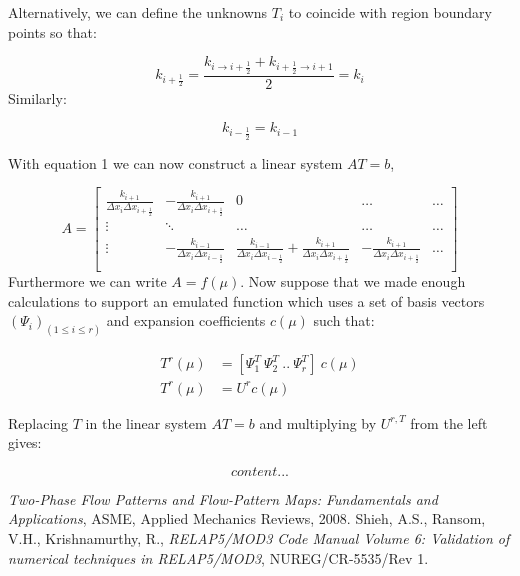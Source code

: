 \documentclass[11pt,letterpaper,titlepage]{article}
\newcommand{\half}{\frac{1}{2}}
\begin{document}
Alternatively, we can define the unknowns $T_i$ to coincide with region boundary points so that:

$$
k_{i+\half} = \frac{k_{i\to i+\half}+k_{i+\half\to i+1}}{2} = k_i
$$
Similarly:

$$
k_{i-\half} = k_{i-1}
$$

\noindent With equation 1 we can now construct a linear system $AT=b$,

\begin{equation*}
A=
\begin{bmatrix}
\frac{k_{i+1}}{\Delta x_i \Delta x_{i+\half}}
&-\frac{k_{i+1}}{\Delta x_i \Delta x_{i+\half}} &0 &\hdots &\hdots\\
\vdots &\ddots &\hdots &\hdots &\hdots\\
\vdots
&-\frac{k_{i-1}}{\Delta x_i \Delta x_{i-\half}} 
&\frac{k_{i-1}}{\Delta x_i \Delta x_{i-\half}} + \frac{k_{i+1}}{\Delta x_i \Delta x_{i+\half}}
&-\frac{k_{i+1}}{\Delta x_i \Delta x_{i+\half}}
&\hdots   \\
\end{bmatrix}
\end{equation*}
\newline
\noindent Furthermore we can write $A=f(\mu)$. Now suppose that we made enough calculations to support an emulated function which uses a set of basis vectors $(\Psi_i)_{(1\le i\le r)}$ and expansion coefficients $c(\mu)$ such that:

\begin{equation}
\begin{aligned}
T^r(\mu) &= 
[
\Psi_1^T \ \Psi_2^T \ .. \ \Psi_r^T 
]
\ c(\mu)\\
T^r(\mu) &= U^r c(\mu)
\end{aligned}
\end{equation}

Replacing $T$ in the linear system $AT=b$ and multiplying by $U^{r,T}$ from the left gives:

\begin{equation*}
content...
\end{equation*}







\newpage
{}
\begin{thebibliography}{1}
	 {\em Two-Phase Flow Patterns and Flow-Pattern Maps: Fundamentals and Applications}, ASME, Applied Mechanics Reviews, 2008.
	 Shieh, A.S., Ransom, V.H., Krishnamurthy, R., {\em RELAP5/MOD3 Code Manual Volume 6: Validation of numerical techniques in RELAP5/MOD3}, NUREG/CR-5535/Rev 1.
\end{thebibliography}
\end{document}
